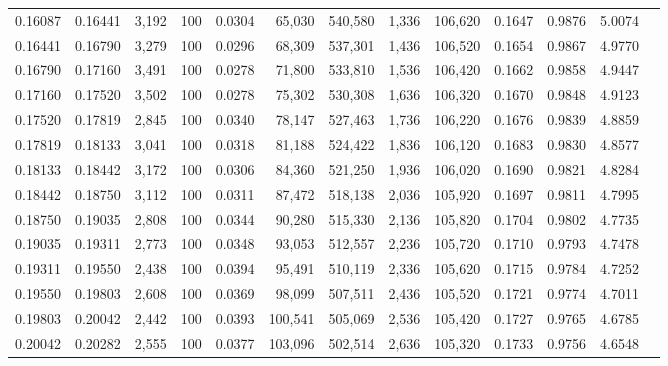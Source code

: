 \begin{tabular}{rrrrrrrrrrrrr}
0.16087 & 0.16441 & 3,192 & 100 &                                     0.0304 &  65,030 & 540,580 &   1,336 & 106,620 & 0.1647 & 0.9876 & 5.0074 \\
0.16441 & 0.16790 & 3,279 & 100 &                                     0.0296 &  68,309 & 537,301 &   1,436 & 106,520 & 0.1654 & 0.9867 & 4.9770 \\
0.16790 & 0.17160 & 3,491 & 100 &                                     0.0278 &  71,800 & 533,810 &   1,536 & 106,420 & 0.1662 & 0.9858 & 4.9447 \\
0.17160 & 0.17520 & 3,502 & 100 &                                     0.0278 &  75,302 & 530,308 &   1,636 & 106,320 & 0.1670 & 0.9848 & 4.9123 \\
0.17520 & 0.17819 & 2,845 & 100 &                                     0.0340 &  78,147 & 527,463 &   1,736 & 106,220 & 0.1676 & 0.9839 & 4.8859 \\
0.17819 & 0.18133 & 3,041 & 100 &                                     0.0318 &  81,188 & 524,422 &   1,836 & 106,120 & 0.1683 & 0.9830 & 4.8577 \\
0.18133 & 0.18442 & 3,172 & 100 &                                     0.0306 &  84,360 & 521,250 &   1,936 & 106,020 & 0.1690 & 0.9821 & 4.8284 \\
0.18442 & 0.18750 & 3,112 & 100 &                                     0.0311 &  87,472 & 518,138 &   2,036 & 105,920 & 0.1697 & 0.9811 & 4.7995 \\
0.18750 & 0.19035 & 2,808 & 100 &                                     0.0344 &  90,280 & 515,330 &   2,136 & 105,820 & 0.1704 & 0.9802 & 4.7735 \\
0.19035 & 0.19311 & 2,773 & 100 &                                     0.0348 &  93,053 & 512,557 &   2,236 & 105,720 & 0.1710 & 0.9793 & 4.7478 \\
0.19311 & 0.19550 & 2,438 & 100 &                                     0.0394 &  95,491 & 510,119 &   2,336 & 105,620 & 0.1715 & 0.9784 & 4.7252 \\
0.19550 & 0.19803 & 2,608 & 100 &                                     0.0369 &  98,099 & 507,511 &   2,436 & 105,520 & 0.1721 & 0.9774 & 4.7011 \\
0.19803 & 0.20042 & 2,442 & 100 &                                     0.0393 & 100,541 & 505,069 &   2,536 & 105,420 & 0.1727 & 0.9765 & 4.6785 \\
0.20042 & 0.20282 & 2,555 & 100 &                                     0.0377 & 103,096 & 502,514 &   2,636 & 105,320 & 0.1733 & 0.9756 & 4.6548 \\

\end{tabular}
